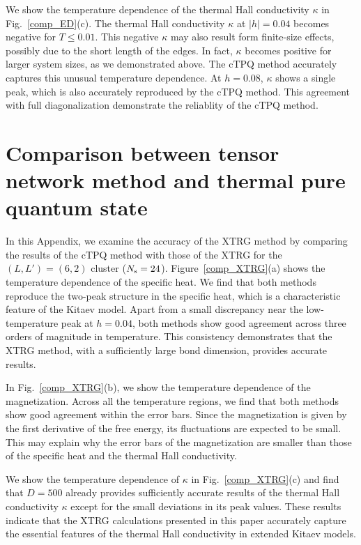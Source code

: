 \documentclass[twocolumn,superscriptaddress,showpacs, longbibliography, aps, prb]{revtex4-2}
\begin{document}
We show the temperature dependence of the thermal 
Hall conductivity $\kappa$ in Fig.~\ref{comp_ED}(c).
The thermal Hall conductivity $\kappa$ at $|h|=0.04$
becomes negative for $T\leq 0.01$. This negative $\kappa$ may also %
result form finite-size effects, possibly due to the short length of the edges.
In fact, $\kappa$ becomes positive for larger system sizes, as we %
demonstrated above.
The cTPQ method %
accurately captures this unusual temperature dependence.
At $h=0.08$, $\kappa$ shows 
a single peak, %
which is also accurately reproduced by the cTPQ method.
This agreement with %
full diagonalization demonstrate
the %
reliablity of the cTPQ method.

\section{Comparison between tensor network method and thermal pure quantum state}
\label{app:XTRGcTPQ}
In this Appendix, we examine the accuracy of the XTRG method
by comparing the results of the cTPQ method with those of the XTRG
for the $(L, L') = (6, 2)$ cluster ($N_{\rm s}=24$). 
Figure~\ref{comp_XTRG}(a) shows the temperature dependence of the specific heat. 
We find that both methods reproduce the two-peak structure in the specific heat, which is a 
characteristic feature %
of the Kitaev model. 
Apart from a small discrepancy %
near the low-temperature peak 
at $h=0.04$, both methods %
show good agreement across three orders of magnitude in temperature.
This consistency demonstrates that the XTRG method, with a sufficiently large 
bond dimension, 
provides accurate results.

In Fig.~\ref{comp_XTRG}(b),
we show the temperature dependence of the magnetization.
Across all the temperature regions, 
we find that both methods %
show good agreement within the error bars.
Since the magnetization is given by the first derivative of the
free energy, its fluctuations are expected to be small.
This may %
explain why the error bars of the magnetization
are smaller than those of the specific heat and the thermal Hall conductivity.

We show the temperature dependence of $\kappa$
in Fig.~\ref{comp_XTRG}(c) and find that
$D=500$ already %
provides sufficiently accurate
results of the thermal Hall conductivity $\kappa$ except for the small deviations %
in its peak values. 
These results indicate that  
the XTRG calculations %
presented in this paper %
accurately capture the %
essential features of the
thermal Hall conductivity in %
extended Kitaev models. 
\end{document}
